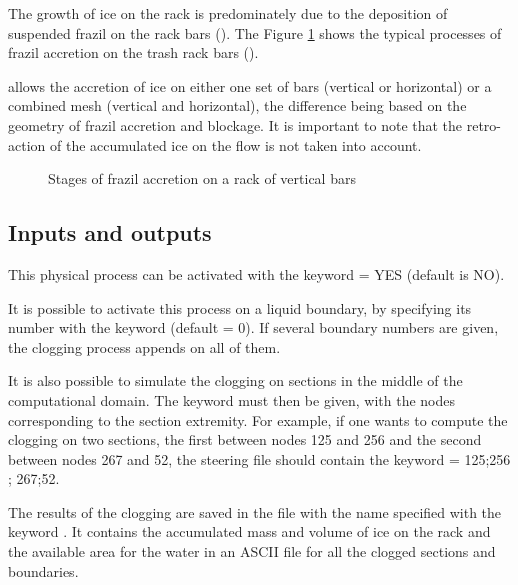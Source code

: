 The growth of ice on the rack is predominately due to the deposition of suspended frazil on the rack bars (\cite{daly1987modeling}). The Figure \ref{fig:vertical_clogging} shows the typical processes of frazil accretion on the trash rack bars (\cite{daly1991frazil}).\newline

\khione allows the accretion of ice on either one set of bars (vertical or horizontal) or a combined mesh (vertical and horizontal), the difference being based on the geometry of frazil accretion and blockage. It is important to note that the retro-action of the accumulated ice on the flow is not taken into account.\newline

\begin{figure}[H]
    \begin{center}
    \end{center}
    \caption{Stages of frazil accretion on a rack of vertical bars}
    \label{fig:vertical_clogging}
\end{figure}

\subsection{Inputs and outputs}

This physical process can be activated with the keyword  = YES (default is NO).\newline

It is possible to activate this process on a liquid boundary, by specifying its number with the keyword  (default = 0). If several boundary numbers are given, the clogging process appends on all of them.\newline

It is also possible to simulate the clogging on sections in the middle of the computational domain. The keyword  must then be given, with the nodes corresponding to the section extremity. For example, if one wants to compute the clogging on two sections, the first between nodes 125 and 256 and the second between nodes 267 and 52, the steering file should contain the keyword  = 125;256 ; 267;52.\newline

The results of the clogging are saved in the file with the name specified with the keyword . It contains the accumulated mass and volume of ice on the rack and the available area for the water in an ASCII file for all the clogged sections and boundaries.\newline

